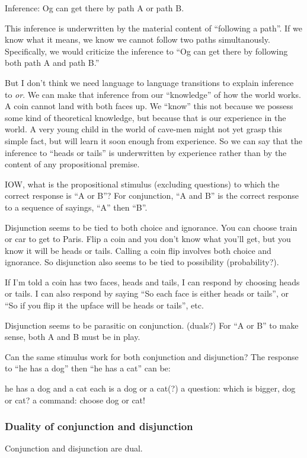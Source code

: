 \documentclass{article}
\begin{document}
Inference: Og can get there by path A or path B.

This inference is underwritten by the material content of ``following
a path''. If we know what it means, we know we cannot follow two paths
simultanously. Specifically, we would criticize the inference to ``Og
can get there by following both path A and path B.''

But I don't think we need language to language transitions to explain
inference to \textit{or}. We can make that inference from our
\enquote{knowledge} of how the world works. A coin cannot land with both
faces up. We ``know'' this not because we possess some kind of
theoretical knowledge, but because that is our experience in the
world. A very young child in the world of cave-men might not yet grasp
this simple fact, but will learn it soon enough from experience. So we
can say that the inference to ``heads or tails'' is underwritten by
experience rather than by the content of any propositional premise.

IOW, what is the propositional stimulus (excluding questions) to which
the correct response is ``A or B''? For conjunction, ``A and B'' is the
correct response to a sequence of sayings, ``A'' then ``B''.

Disjunction seems to be tied to both choice and ignorance. You can
choose train or car to get to Paris. Flip a coin and you don't know
what you'll get, but you know it will be heads or tails. Calling a
coin flip involves both choice and ignorance. So disjunction also
seems to be tied to possibility (probability?).

If I'm told a coin has two faces, heads and tails, I can respond by
choosing heads or tails. I can also respond by saying ``So each face
is either heads or tails'', or ``So if you flip it the upface will be
heads or tails'', etc.

Disjunction seems to be parasitic on conjunction. (duals?) For ``A or
B'' to make sense, both A and B must be in play.

Can the same stimulus work for both conjunction and disjunction? The
response to ``he has a dog'' then ``he has a cat'' can be:

he has a dog and a cat
each is a dog or a cat(?)
a question: which is bigger, dog or cat?
a command: choose dog or cat!

\subsubsection{Duality of conjunction and disjunction}
Conjunction and disjunction are dual.
\end{document}
